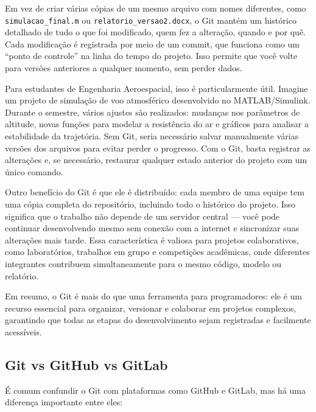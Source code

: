 Em vez de criar várias cópias de um mesmo arquivo com nomes diferentes, como \texttt{simulacao\_final.m} ou \texttt{relatorio\_versao2.docx}, o Git mantém um histórico detalhado de tudo o que foi modificado, quem fez a alteração, quando e por quê. Cada modificação é registrada por meio de um commit, que funciona como um “ponto de controle” na linha do tempo do projeto. Isso permite que você volte para versões anteriores a qualquer momento, sem perder dados.

Para estudantes de Engenharia Aeroespacial, isso é particularmente útil. Imagine um projeto de simulação de voo atmosférico desenvolvido no MATLAB/Simulink. Durante o semestre, vários ajustes são realizados: mudanças nos parâmetros de altitude, novas funções para modelar a resistência do ar e gráficos para analisar a estabilidade da trajetória. Sem Git, seria necessário salvar manualmente várias versões dos arquivos para evitar perder o progresso. Com o Git, basta registrar as alterações e, se necessário, restaurar qualquer estado anterior do projeto com um único comando.

Outro benefício do Git é que ele é distribuído: cada membro de uma equipe tem uma cópia completa do repositório, incluindo todo o histórico do projeto. Isso significa que o trabalho não depende de um servidor central — você pode continuar desenvolvendo mesmo sem conexão com a internet e sincronizar suas alterações mais tarde. Essa característica é valiosa para projetos colaborativos, como laboratórios, trabalhos em grupo e competições acadêmicas, onde diferentes integrantes contribuem simultaneamente para o mesmo código, modelo ou relatório.

Em resumo, o Git é mais do que uma ferramenta para programadores: ele é um recurso essencial para organizar, versionar e colaborar em projetos complexos, garantindo que todas as etapas do desenvolvimento sejam registradas e facilmente acessíveis.

\subsection{Git vs GitHub vs GitLab}

É comum confundir o Git com plataformas como GitHub e GitLab, mas há uma diferença importante entre eles:

